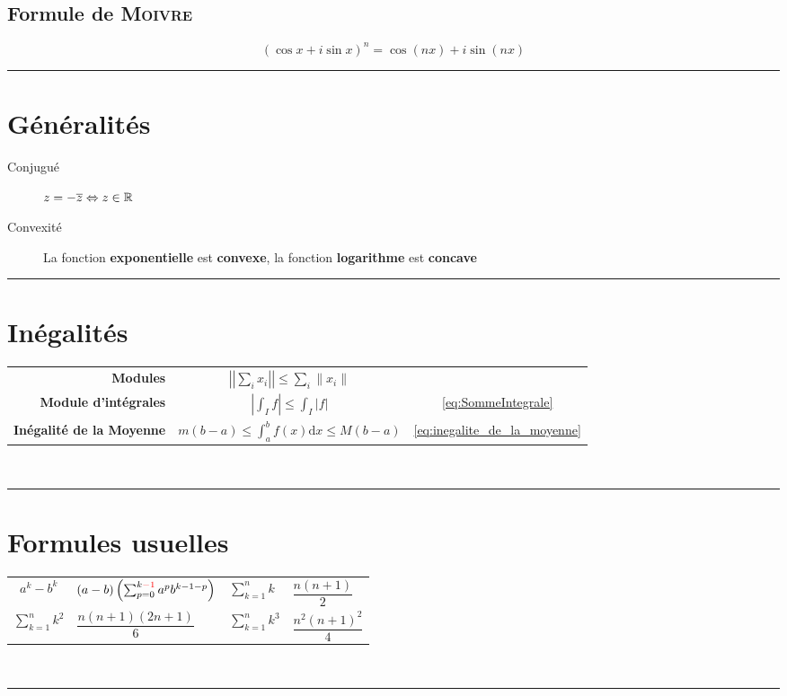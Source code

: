\documentclass[11pt,a4paper,fleqn,pdftex]{report}
\begin{document}
\subsection{Formule de \textsc{Moivre}} %
\label{sub:Moivre}
\begin{equation}
(\cos x + i \sin x)^n = \cos (nx) + i\sin (nx)
\end{equation}
\rule{\columnwidth}{0.5pt}
\section*{Généralités}
\begin{description}
\item[Conjugué] $z = -\overline{z} \Leftrightarrow z \in \mathbb{R}$
\item[Convexité] La fonction \textbf{exponentielle} est \textbf{convexe}, la fonction \textbf{logarithme} est \textbf{concave}
\end{description}
\needspace{5cm}
\rule{\columnwidth}{0.5pt}
\section*{Inégalités}
\begin{tabular}{ >{ \bfseries} r c c}
    Modules & $\left|\left|\sum_i x_i \right| \right| \le \sum_i \| x_i \|$& \\[5mm]
    Module d'intégrales & $\left| \int_I f \right| \le \int_I \left| f \right| $ & \eqref{eq:SommeIntegrale} \\[3mm]
    Inégalité de la Moyenne & $m(b-a)\le \int_a^b f(x) \mathrm{d}x \le M(b-a)$ & \eqref{eq:inegalite_de_la_moyenne}
\end{tabular} \\[3mm]
\rule{\columnwidth}{0.5pt}
\section{Formules usuelles} %
\label{sec:formules_usuelles}
\begin{tabular}{c@{$\; = \;$}l@{$\qquad$} | @{$\qquad$}l@{$\; = \;$}l}
    $a^k - b^k$&$(a-b) \left( \sum_{p=0}^{k\textcolor{couleurImp}{-1}} a^p b^{k-1-p} \right) $ &
    $\sum_{k=1}^n k$    & $\dfrac{n(n+1)}{2}$ \\[6mm]
    $\sum_{k=1}^n k^2$  & $\dfrac{n(n+1)(2n+1)}{6}$ &
    $\sum_{k=1}^n k^3$  & $\dfrac{n^2(n+1)^2}{4}$ \\[3mm]
\end{tabular} \\[6mm]
\rule{\columnwidth}{0.5pt}
\end{document}
